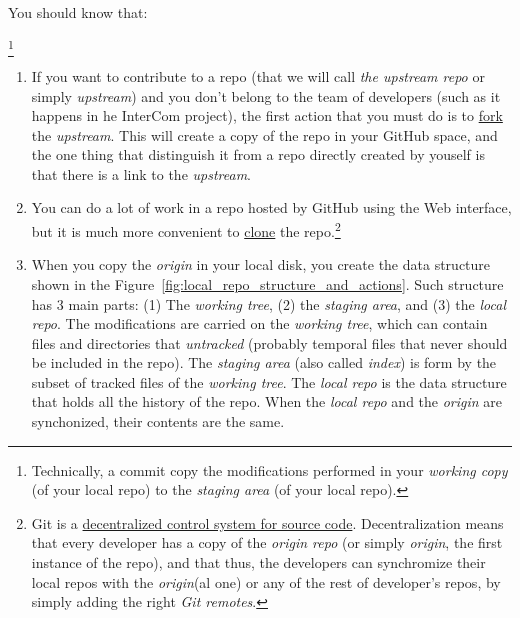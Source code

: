 You should know that:

\footnote{Technically, a commit copy the modifications
performed in your \emph{working copy} (of your local repo) to the
\emph{staging area} (of your local repo).}

\begin{enumerate}

\item If you want to contribute to a repo (that we will call \emph{the
upstream repo} or simply \emph{upstream}) \cite{Git-workflow} and you
  don't belong to the team of developers (such as it happens in he
  InterCom project), the first action that you must do is to
  \href{https://docs.github.com/en/github/getting-started-with-github/fork-a-repo}{fork}
  the \emph{upstream}. This will create a copy of the repo in your
  GitHub space, and the one thing that distinguish it from a repo
  directly created by youself is that there is a link to the
  \emph{upstream}.

\item You can do a lot of work in a repo hosted by GitHub using the
  Web interface, but it is much more convenient to
  \href{https://docs.github.com/en/github/creating-cloning-and-archiving-repositories/cloning-a-repository}{clone}
  the repo.\footnote{Git is a
  \href{https://nvie.com/posts/a-successful-git-branching-model/}{decentralized
    control system for source code}. Decentralization means that every
  developer has a copy of the \emph{origin repo} (or simply
  \emph{origin}, the first instance of the repo), and that thus, the
  developers can synchromize their local repos with the
  \emph{origin}(al one) or any of the rest of developer's repos, by
  simply adding the right \emph{Git remotes}.}

\item When you copy the \emph{origin} in your local disk, you create
  the data structure shown in the
  Figure~\ref{fig:local_repo_structure_and_actions}. Such structure
  has 3 main parts: (1) The \emph{working tree}, (2) the \emph{staging
  area}, and (3) the \emph{local repo}. The modifications are carried
  on the \emph{working tree}, which can contain files and directories
  that \emph{untracked} (probably temporal files that never should be
  included in the repo). The \emph{staging area} (also called
  \emph{index}) is form by the subset of tracked files of the
  \emph{working tree}. The \emph{local repo} is the data structure
  that holds all the history of the repo. When the \emph{local repo}
  and the \emph{origin} are synchonized, their contents are the same.


\end{enumerate}
